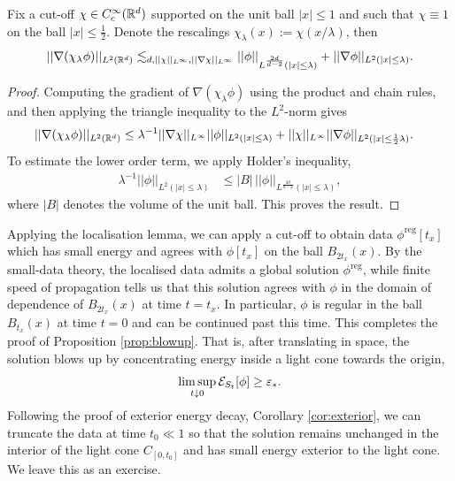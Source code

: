 \begin{lemma}\label{lem:local}
	Fix a cut-off $\chi \in C^\infty_c (\mathbb R^d)$ supported on the unit ball $|x| \leq 1$ and such that $\chi \equiv 1$ on the ball $|x| \leq \tfrac12$. Denote the rescalings $\chi_\lambda (x) := \chi(x/\lambda)$, then 
		\[
			||\nabla (\chi_\lambda \phi) ||_{L^2 (\mathbb R^d)} \lesssim_{d, ||\chi||_{L^\infty}, ||\nabla\chi||_{L^\infty}} ||\phi||_{L^{\frac{2d}{d - 2}} (|x|\leq \lambda)}  +  ||\nabla \phi||_{L^2 (|x| \leq \lambda)}.
		\]
\end{lemma}

\begin{proof}
	Computing the gradient of $\nabla (\chi_\lambda \phi)$ using the product and chain rules, and then applying the triangle inequality to the $L^2$-norm gives 
		\begin{align*}
			||\nabla (\chi_\lambda \phi) ||_{L^2 (\mathbb R^d)} 
				&\leq \lambda^{-1} ||\nabla \chi||_{L^\infty} || \phi||_{L^2 (|x| \leq \lambda)} + ||\chi ||_{L^\infty} || \nabla \phi||_{L^2 (|x| \leq \frac12 \lambda)} .
		\end{align*}
	To estimate the lower order term, we apply Holder's inequality,
		\begin{align*}
			 \lambda^{-1} || \phi||_{L^2 (|x| \leq \lambda)}
			 	&\leq  |B|\,  ||\phi||_{L^{\frac{2d}{d - 2}} (|x| \leq \lambda)},
		\end{align*}	
	where $|B|$ denotes the volume of the unit ball. This proves the result. 
\end{proof}

Applying the localisation lemma, we can apply a cut-off to obtain data $\phi^{\mathrm{reg}} [t_x]$ which has small energy and agrees with $\phi[t_x]$ on the ball $B_{2t_x} (x)$. By the small-data theory, the localised data admits a global solution $\phi^{\mathrm{reg}}$, while finite speed of propagation tells us that this solution agrees with $\phi$ in the domain of dependence of $B_{2t_x} (x)$ at time $t = t_x$. In particular, $\phi$ is regular in the ball $B_{t_x} (x)$ at time $t = 0$ and can be continued past this time. This completes the proof of Proposition \ref{prop:blowup}. That is, after translating in space, the solution blows up by concentrating energy inside a light cone towards the origin, 
	\[
		\limsup_{t \downarrow 0}\mathcal E_{S_t} [\phi] \geq \varepsilon_*. 
	\]
Following the proof of exterior energy decay, Corollary \ref{cor:exterior}, we can truncate the data at time $t_0 \ll 1$ so that the solution remains unchanged in the interior of the light cone $C_{[0, t_0]}$ and has small energy exterior to the light cone. We leave this as an exercise. 









